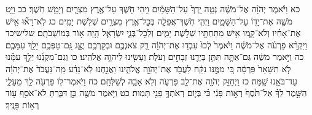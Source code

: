 \documentclass[twoside, openany, parskip=half, 11pt]{book}
\begin{document}
כא וַיֹּ֨אמֶר יְהֹוָ֜ה אֶל־מֹשֶׁ֗ה נְטֵ֤ה יָֽדְךָ֙ עַל־הַשָּׁמַ֔יִם וִ֥יהִי חֹ֖שֶׁךְ עַל־אֶ֣רֶץ מִצְרָ֑יִם וְיָמֵ֖שׁ חֹֽשֶׁךְ׃ כב וַיֵּ֥ט מֹשֶׁ֛ה אֶת־יָד֖וֹ עַל־הַשָּׁמָ֑יִם וַיְהִ֧י חֹֽשֶׁךְ־אֲפֵלָ֛ה בְּכׇל־אֶ֥רֶץ מִצְרַ֖יִם שְׁלֹ֥שֶׁת יָמִֽים׃ כג לֹֽא־רָא֞וּ אִ֣ישׁ אֶת־אָחִ֗יו וְלֹא־קָ֛מוּ אִ֥ישׁ מִתַּחְתָּ֖יו שְׁלֹ֣שֶׁת יָמִ֑ים וּֽלְכׇל־בְּנֵ֧י יִשְׂרָאֵ֛ל הָ֥יָה א֖וֹר בְּמוֹשְׁבֹתָֽם׃ שלישיכד וַיִּקְרָ֨א פַרְעֹ֜ה אֶל־מֹשֶׁ֗ה וַיֹּ֙אמֶר֙ לְכוּ֙ עִבְד֣וּ אֶת־יְהֹוָ֔ה רַ֛ק צֹאנְכֶ֥ם וּבְקַרְכֶ֖ם יֻצָּ֑ג גַּֽם־טַפְּכֶ֖ם יֵלֵ֥ךְ עִמָּכֶֽם׃ כה וַיֹּ֣אמֶר מֹשֶׁ֔ה גַּם־אַתָּ֛ה תִּתֵּ֥ן בְּיָדֵ֖נוּ זְבָחִ֣ים וְעֹלֹ֑ת וְעָשִׂ֖ינוּ לַיהֹוָ֥ה אֱלֹהֵֽינוּ׃ כו וְגַם־מִקְנֵ֜נוּ יֵלֵ֣ךְ עִמָּ֗נוּ לֹ֤א תִשָּׁאֵר֙ פַּרְסָ֔ה כִּ֚י מִמֶּ֣נּוּ נִקַּ֔ח לַעֲבֹ֖ד אֶת־יְהֹוָ֣ה אֱלֹהֵ֑ינוּ וַאֲנַ֣חְנוּ לֹֽא־נֵדַ֗ע מַֽה־נַּעֲבֹד֙ אֶת־יְהֹוָ֔ה עַד־בֹּאֵ֖נוּ שָֽׁמָּה׃ כז וַיְחַזֵּ֥ק יְהֹוָ֖ה אֶת־לֵ֣ב פַּרְעֹ֑ה וְלֹ֥א אָבָ֖ה לְשַׁלְּחָֽם׃ כח וַיֹּֽאמֶר־ל֥וֹ פַרְעֹ֖ה לֵ֣ךְ מֵעָלָ֑י הִשָּׁ֣מֶר לְךָ֗ אַל־תֹּ֙סֶף֙ רְא֣וֹת פָּנַ֔י כִּ֗י בְּי֛וֹם רְאֹתְךָ֥ פָנַ֖י תָּמֽוּת׃ כט וַיֹּ֥אמֶר מֹשֶׁ֖ה כֵּ֣ן דִּבַּ֑רְתָּ לֹא־אֹסִ֥ף ע֖וֹד רְא֥וֹת פָּנֶֽיךָ׃
\end{document}
